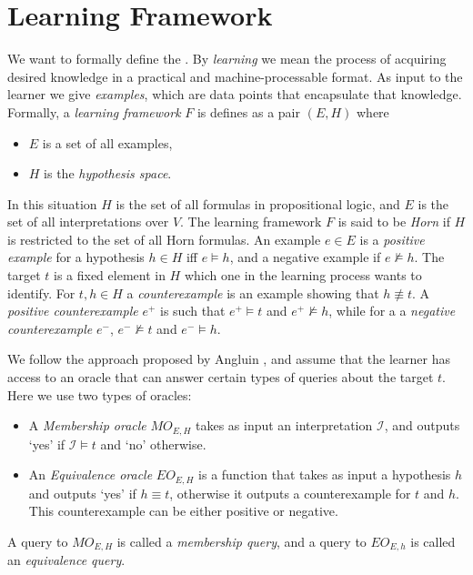 \section{Learning Framework}
We want to formally define the . By \emph{learning} we mean the process of acquiring desired knowledge in a practical and machine-processable format. As input to the learner we give \emph{examples}, which are data points that encapsulate that knowledge. Formally, a \emph{learning framework} $F$ is defines as a pair $(E, H)$ where
\begin{itemize}
    \item $E$ is a set of all examples,
    \item $H$ is the \emph{hypothesis space}.
\end{itemize}
In this situation $H$ is the set of all formulas in propositional logic, and $E$ is the set of all interpretations over $V$. The learning framework $F$ is said to be \emph{Horn} if $H$ is restricted to the set of all Horn formulas. An example $e \in E$ is a \emph{positive example} for a hypothesis $h \in H$ iff $e \models h$, and a negative example if $e \not \models h$. The target $t$ is a fixed element in $H$ which one in the learning process wants to identify. For $t, h \in H$ a \emph{counterexample} is an example showing that $h \not \equiv t$. A \emph{positive counterexample} $e^+$ is such that $e^+ \models t$ and $e^+ \not \models h$, while for a a \emph{negative counterexample} $e^-$, $e^- \not \models t$ and $e^- \models h$.

We follow the approach proposed by Angluin \cite{DBLP:journals/ml/AngluinFP92}, and assume that the learner has access to an oracle that can answer certain types of queries about the target $t$. Here we use two types of oracles:
\begin{itemize}
    \item A \emph{Membership oracle} $MO_{E, H}$ takes as input an interpretation $\mathcal{I}$, and outputs `yes' if $\mathcal{I} \models t$ and `no' otherwise.
    \item An \emph{Equivalence oracle} $EO_{E,H}$ is a function that takes as input a hypothesis $h$ and outputs `yes' if $h \equiv t$, otherwise it outputs a counterexample for $t$ and $h$. This counterexample can be either positive or negative.
\end{itemize}
A query to $MO_{E, H}$ is called a \emph{membership query}, and a query to $EO_{E, h}$ is called an \emph{equivalence query}.

